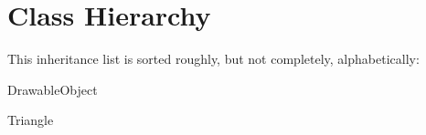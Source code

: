 \section{Class Hierarchy}
This inheritance list is sorted roughly, but not completely, alphabetically\+:\begin{DoxyCompactList}
\item Drawable\+Object\begin{DoxyCompactList}
\item {}
\item {}
\item {}
\end{DoxyCompactList}
\item Triangle\begin{DoxyCompactList}
\item {}
\end{DoxyCompactList}
\end{DoxyCompactList}
